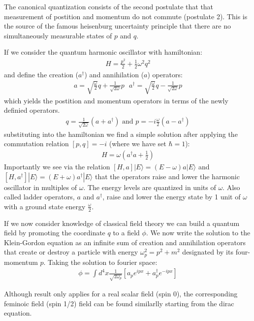 The canonical quantization consists of the second postulate that that measurement of postition
and momentum do not commute (postulate 2). This is the source of the famous heisenburg uncertainty
principle that there are no simultaneously measurable states of $p$ and $q$. 

If we consider the quantum harmonic oscillator with hamiltonian:
\begin{align*}
H = \frac{p^2}{2} + \frac{1}{2}\omega^2 q^2
\end{align*}
and define the creation ($a^\dagger$) and annihilation ($a$) operators:
\begin{align*}
a = \sqrt{\frac{\omega}{2}}q + \frac{1}{\sqrt{2\omega}}p \text{  } a^\dagger = \sqrt{\frac{\omega}{2}}q - \frac{1}{\sqrt{2\omega}}p 
\end{align*}
which yields the postition and momentum operators in terms of the newly definied operators. 
\begin{align*}
q = \frac{1}{\sqrt{2\omega}} (a + a^\dagger) \text{ and } p = -i \frac{\omega}{2}( a - a^\dagger) 
\end{align*}
 substituting into the hamiltonian we find a simple solution after applying
the commutation relation $[p,q]=-i$ (where we have set $\hbar=1$):
\begin{align*}
H =  \omega(a^\dagger a + \frac{1}{2}) 
\end{align*}
Importantly we see via the relation $[H,a]|E\rangle = (E-\omega)a|E\rangle$ and 
$[H,a^\dagger]|E\rangle = (E+\omega)a^\dagger|E\rangle$ that the operators raise and 
lower the harmonic oscillator in multiples of $\omega$. The energy levels are quantized 
in units of $\omega$. Also called ladder operators, $a$ and $a^\dagger$, raise and lower
the energy state by 1 unit of $\omega$ with a ground state energy $\frac{\omega}{2}$. 

If we now consider knowledge of classical field theory we can build a quantum field by
promoting the coordinate $q$ to a field $\phi$. We now write
the solution to the Klein-Gordon equation as an infinite sum of creation and 
annihilation operators that create or destroy a particle with energy $\omega_p^2 =
p^2 + m^2$ designated by its four-momentum $p$. Taking the solution to fourier space:
\begin{align*}
\phi = \int d^4x \frac{1}{\sqrt{2\omega_{p}}} \left [  a_p e^{ipx} + a_p^\dagger e^{-ipx} \right ]
\end{align*} 

Although result only applies for a real scalar field (spin 0), the corresponding feminoic field (spin 1/2)
field can be found similarlly starting from the dirac equation. 

